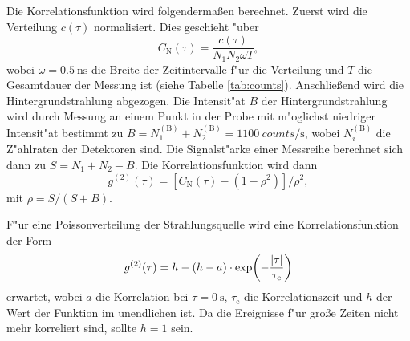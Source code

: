 Die Korrelationsfunktion wird folgenderma\ss en berechnet.
Zuerst wird die Verteilung $c(\tau)$ normalisiert.
Dies geschieht "uber
\begin{equation}
C_\text{N}(\tau)
    =\frac{c(\tau)}{N_1N_2\omega T},
    \label{eq:CN}
\end{equation}
wobei $\omega=\SI{0.5}{\nano\second}$ die Breite der Zeitintervalle f"ur die Verteilung und $T$ die Gesamtdauer der Messung ist (siehe Tabelle \vref{tab:counts}).
Anschlie\ss end wird die Hintergrundstrahlung abgezogen.
Die Intensit"at $B$ der Hintergrundstrahlung wird durch Messung an einem Punkt in der Probe mit m"oglichst niedriger Intensit"at bestimmt zu $B=N_1^{(\text{B})}+N_2^{(\text{B})}=\SI{1100}{counts\per\second}$, wobei $N_i^{(\text{B})}$ die Z"ahlraten der Detektoren sind.
Die Signalst"arke einer Messreihe berechnet sich dann zu $S=N_1+N_2-B$.
Die Korrelationsfunktion wird dann
\begin{equation}
g^{(2)}(\tau)
    =\left[ C_\text{N}(\tau)-(1-\rho^2)\right]/\rho^2,
    \label{eq:g2}
\end{equation}
mit $\rho=S/(S+B)$.

F"ur eine Poissonverteilung der Strahlungsquelle wird eine Korrelationsfunktion der Form
\begin{equation}
g^{(2)}(\tau)
    =h-(h-a)\cdot \exp(-\frac{\abs{\tau}}{\tau_\text{c}})
    \label{eq:fit}
\end{equation}
erwartet, wobei $a$ die Korrelation bei $\tau=\SI{0}{\second}$, $\tau_\text{c}$ die Korrelationszeit und $h$ der Wert der Funktion im unendlichen ist.
Da die Ereignisse f"ur gro\ss e Zeiten nicht mehr korreliert sind, sollte $h=1$ sein.